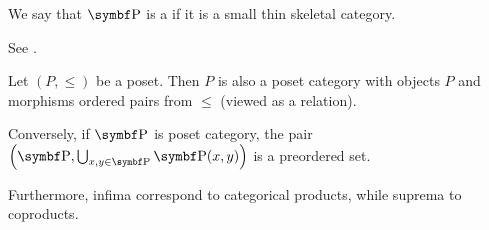 \begin{definition}\label{def:poset_category}
  We say that \( \Cat{P} \) is a  if it is a small thin skeletal category.

  See .
\end{definition}

\begin{proposition}\label{thm:poset_iff_poset_category}
  Let \( (P, \leq) \) be a poset. Then \( P \) is also a poset category with objects \( P \) and morphisms ordered pairs from \( \leq \) (viewed as a relation).

  Conversely, if \( \Cat{P} \) is poset category, the pair \( \left(\Bold{P}, \bigcup_{x, y \in \Bold{P}} \Bold{P}(x, y) \right) \) is a preordered set.

  Furthermore, infima correspond to categorical products, while suprema to coproducts.
\end{proposition}
